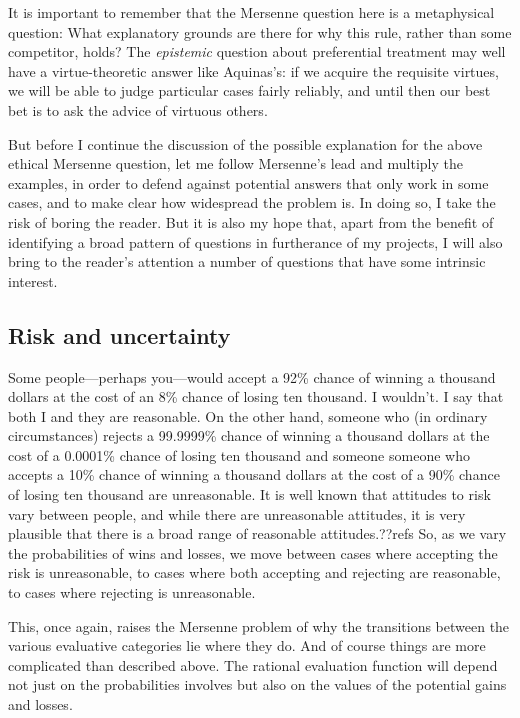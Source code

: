 It is important to remember that the Mersenne question here is a metaphysical question: What explanatory grounds are there for why this
rule, rather than some competitor, holds? The \textit{epistemic} question about preferential treatment may well have a virtue-theoretic answer like Aquinas's: if
we acquire the requisite virtues, we will be able to judge particular cases fairly reliably, and until then our best bet is
to ask the advice of virtuous others.

But before I continue the discussion of the possible explanation for the above ethical Mersenne question, let me follow
Mersenne's lead and multiply the examples, in order to defend against potential answers that only work in some cases, and
to make clear how widespread the problem is. In doing so, I take the risk of boring the reader. But it is also my
hope that, apart from the benefit of identifying a broad pattern of questions in furtherance of my projects, I will 
also bring to the reader's attention a number of questions that have some intrinsic interest.


\subsection{Risk and uncertainty}
Some people---perhaps you---would accept a 92\% chance of winning a thousand dollars at the cost of an 8\% chance
of losing ten thousand. I wouldn't. I say that both I and they are reasonable. On the other hand, someone who 
(in ordinary circumstances) rejects a 99.9999\% chance of winning a thousand dollars at the cost of a 0.0001\% chance
of losing ten thousand and someone someone who accepts a 10\% chance of winning a thousand dollars at the cost of a 90\% chance
of losing ten thousand are unreasonable. 
It is well known that attitudes to risk vary between people, and while there are unreasonable attitudes, it is very plausible
that there is a broad range of reasonable attitudes.??refs
So, as we vary the probabilities of wins and losses, we move between cases
where accepting the risk is unreasonable, to cases where both accepting and rejecting are reasonable, to cases where
rejecting is unreasonable.

This, once again, raises the Mersenne problem of why the transitions between the various evaluative categories lie where they
do.  And of course things are more complicated than described above. The rational evaluation function will depend not just
on the probabilities involves but also on the values of the potential gains and losses. 

